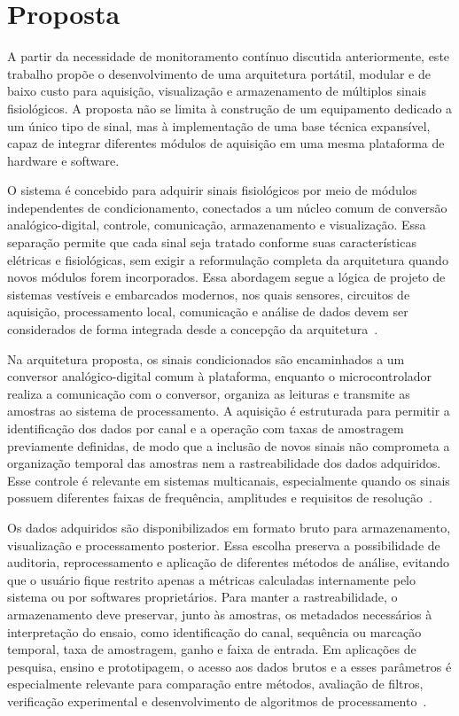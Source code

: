\documentclass[a4paper,12pt]{fcte}
\begin{document}
\section{Proposta}

A partir da necessidade de monitoramento contínuo discutida anteriormente, este trabalho propõe o desenvolvimento de uma arquitetura portátil, modular e de baixo custo para aquisição, visualização e armazenamento de múltiplos sinais fisiológicos. A proposta não se limita à construção de um equipamento dedicado a um único tipo de sinal, mas à implementação de uma base técnica expansível, capaz de integrar diferentes módulos de aquisição em uma mesma plataforma de hardware e software.

O sistema é concebido para adquirir sinais fisiológicos por meio de módulos independentes de condicionamento, conectados a um núcleo comum de conversão analógico-digital, controle, comunicação, armazenamento e visualização. Essa separação permite que cada sinal seja tratado conforme suas características elétricas e fisiológicas, sem exigir a reformulação completa da arquitetura quando novos módulos forem incorporados. Essa abordagem segue a lógica de projeto de sistemas vestíveis e embarcados modernos, nos quais sensores, circuitos de aquisição, processamento local, comunicação e análise de dados devem ser considerados de forma integrada desde a concepção da arquitetura~\cite{ates2022wearable_sensors,vaghasiya2023wearable_telehealth}.

Na arquitetura proposta, os sinais condicionados são encaminhados a um conversor analógico-digital comum à plataforma, enquanto o microcontrolador realiza a comunicação com o conversor, organiza as leituras e transmite as amostras ao sistema de processamento. A aquisição é estruturada para permitir a identificação dos dados por canal e a operação com taxas de amostragem previamente definidas, de modo que a inclusão de novos sinais não comprometa a organização temporal das amostras nem a rastreabilidade dos dados adquiridos. Esse controle é relevante em sistemas multicanais, especialmente quando os sinais possuem diferentes faixas de frequência, amplitudes e requisitos de resolução~\cite{devi2020realtimedaq,ates2022wearable_sensors}.

Os dados adquiridos são disponibilizados em formato bruto para armazenamento, visualização e processamento posterior. Essa escolha preserva a possibilidade de auditoria, reprocessamento e aplicação de diferentes métodos de análise, evitando que o usuário fique restrito apenas a métricas calculadas internamente pelo sistema ou por softwares proprietários. Para manter a rastreabilidade, o armazenamento deve preservar, junto às amostras, os metadados necessários à interpretação do ensaio, como identificação do canal, sequência ou marcação temporal, taxa de amostragem, ganho e faixa de entrada. Em aplicações de pesquisa, ensino e prototipagem, o acesso aos dados brutos e a esses parâmetros é especialmente relevante para comparação entre métodos, avaliação de filtros, verificação experimental e desenvolvimento de algoritmos de processamento~\cite{canali2022wearables_challenges,huhn2022wearables_health_research}.
\end{document}
